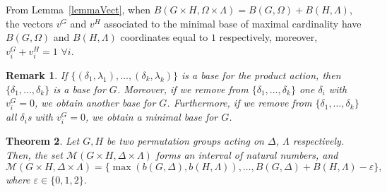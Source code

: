 \documentclass{amsart}
\newtheorem{theorem}{Theorem}[section]
\newtheorem{remark}[theorem]{Remark}
\begin{document}
	From Lemma~\ref{lemmaVect}, when $B(G\times H , \Omega \times \Lambda) = B(G,\Omega) + B(H,\Lambda)$, the vectors $v^G$ and $v^H$ associated to the minimal base of maximal cardinality have $B(G,\Omega)$ and $B(H,\Lambda)$ coordinates equal to $1$ respectively, moreover, $v^G_i+v^H_i =1$ $\forall i$.
	\begin{remark}\label{remark}{\rm
		If $\{(\delta_1,\lambda_1),\dots,(\delta_k,\lambda_k)\}$ is a base for the product action, then $\{\delta_1,\dots,\delta_k\}$ is a base for $G$. Moreover, if we remove from $\{\delta_1,\ldots,\delta_k\}$ one $\delta_i$ with $v^G_i=0$, we obtain another base for $G$. Furthermore, if we remove from $\{\delta_1,\ldots,\delta_k\}$ all $\delta_i$s with $v^G_i=0$, we obtain a minimal base for $G$.}
	\end{remark}
	\begin{theorem}\label{thrm:41}
		Let $G,H$ be two permutation groups acting on $\Delta$, $\Lambda$ respectively. Then, the set $\mathcal{M}(G\times H,\Delta\times\Lambda)$ forms an interval of natural numbers, and
		\[
			\mathcal{M}(G \times H,\Delta\times\Lambda) = \{\max(b(G,\Delta),b(H,\Lambda)), \dots, B(G,\Delta)+B(H,\Lambda) - \varepsilon\},
		\]
		where $\varepsilon \in \{0,1,2\}$.
	\end{theorem}
\end{document}
